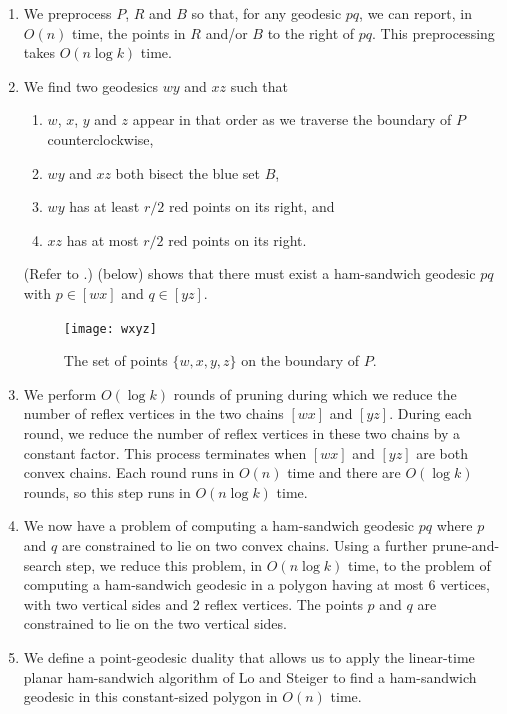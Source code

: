 \documentclass[charterfonts,lotsofwhite]{patmorin}
\newcommand{\chain}[2]{[#1#2]}
\begin{document}
\begin{enumerate}

\item We preprocess $P$, $R$ and $B$ so that, for any geodesic $pq$,
we can report, in $O(n)$ time, the points in $R$ and/or $B$ to the
right of $pq$.  This preprocessing takes $O(n \log k)$ time.

\item We find two geodesics $wy$ and $xz$ such that

\begin{enumerate}

\item $w$, $x$, $y$ and $z$ appear in that order as we traverse the
boundary of $P$ counterclockwise,

\item $wy$ and $xz$ both bisect the blue set $B$,

\item $wy$ has at least $r/2$ red points on its right, and

\item $xz$ has at most $r/2$ red points on its right.

\end{enumerate}

(Refer to .)  (below) shows that there
must exist a ham-sandwich geodesic $pq$ with $p\in \chain{w}{x}$ and
$q\in \chain{y}{z}$.

\begin{figure}[htbp]
\begin{center}\texttt{[image: wxyz]}\end{center}
\caption{The set of points $\{w,x,y,z\}$ on the boundary of $P$.}
\end{figure}

\item We perform $O(\log k)$ rounds of pruning during which we reduce
the number of reflex vertices in the two chains $\chain{w}{x}$ and
$\chain{y}{z}$.  During each round, we reduce the number of reflex
vertices in these two chains by a constant factor.  This process
terminates when $\chain{w}{x}$ and $\chain{y}{z}$ are both convex chains.
Each round runs in $O(n)$ time and there are $O(\log k)$ rounds, so
this step runs in $O(n\log k)$ time.

\item We now have a problem of computing a ham-sandwich geodesic $pq$
where $p$ and $q$ are constrained to lie on two convex chains.  Using
a further prune-and-search step, we reduce this problem, in $O(n\log
k)$ time, to the problem of computing a ham-sandwich geodesic in a
polygon having at most 6 vertices, with two vertical sides and 2
reflex vertices.  The points $p$ and $q$ are constrained to lie on the
two vertical sides.

\item We define a point-geodesic duality that allows us to apply the
linear-time planar ham-sandwich algorithm of Lo and Steiger
\cite{ls90} to find a ham-sandwich geodesic in this constant-sized
polygon in $O(n)$ time.
\end{enumerate}
\end{document}
